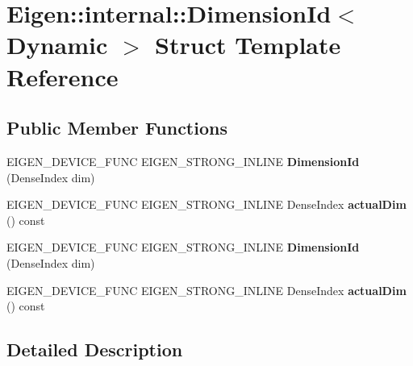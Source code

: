 \hypertarget{struct_eigen_1_1internal_1_1_dimension_id_3_01_dynamic_01_4}{}\section{Eigen\+:\+:internal\+:\+:Dimension\+Id$<$ Dynamic $>$ Struct Template Reference}
\label{struct_eigen_1_1internal_1_1_dimension_id_3_01_dynamic_01_4}
\subsection*{Public Member Functions}
\begin{DoxyCompactItemize}
\item 
\mbox{\label{struct_eigen_1_1internal_1_1_dimension_id_3_01_dynamic_01_4_ac20deb48c1a2749dd5da924c7ecee6fb}} 
E\+I\+G\+E\+N\+\_\+\+D\+E\+V\+I\+C\+E\+\_\+\+F\+U\+NC E\+I\+G\+E\+N\+\_\+\+S\+T\+R\+O\+N\+G\+\_\+\+I\+N\+L\+I\+NE {\bfseries Dimension\+Id} (Dense\+Index dim)
\item 
\mbox{\label{struct_eigen_1_1internal_1_1_dimension_id_3_01_dynamic_01_4_a477f1273898c887d8bd08d1bb125b3f2}} 
E\+I\+G\+E\+N\+\_\+\+D\+E\+V\+I\+C\+E\+\_\+\+F\+U\+NC E\+I\+G\+E\+N\+\_\+\+S\+T\+R\+O\+N\+G\+\_\+\+I\+N\+L\+I\+NE Dense\+Index {\bfseries actual\+Dim} () const
\item 
\mbox{\label{struct_eigen_1_1internal_1_1_dimension_id_3_01_dynamic_01_4_ac20deb48c1a2749dd5da924c7ecee6fb}} 
E\+I\+G\+E\+N\+\_\+\+D\+E\+V\+I\+C\+E\+\_\+\+F\+U\+NC E\+I\+G\+E\+N\+\_\+\+S\+T\+R\+O\+N\+G\+\_\+\+I\+N\+L\+I\+NE {\bfseries Dimension\+Id} (Dense\+Index dim)
\item 
\mbox{\label{struct_eigen_1_1internal_1_1_dimension_id_3_01_dynamic_01_4_a477f1273898c887d8bd08d1bb125b3f2}} 
E\+I\+G\+E\+N\+\_\+\+D\+E\+V\+I\+C\+E\+\_\+\+F\+U\+NC E\+I\+G\+E\+N\+\_\+\+S\+T\+R\+O\+N\+G\+\_\+\+I\+N\+L\+I\+NE Dense\+Index {\bfseries actual\+Dim} () const
\end{DoxyCompactItemize}


\subsection{Detailed Description}
